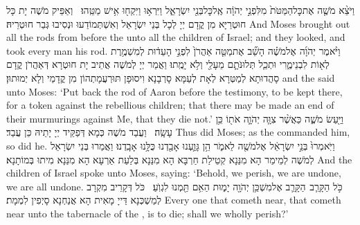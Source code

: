 {וַיֹּצֵ֨א מֹשֶׁ֤ה אֶת\maqqaf כׇּל\maqqaf הַמַּטֹּת֙ מִלִּפְנֵ֣י יְהֹוָ֔ה אֶֽל\maqqaf כׇּל\maqqaf בְּנֵ֖י יִשְׂרָאֵ֑ל וַיִּרְא֥וּ וַיִּקְח֖וּ אִ֥ישׁ מַטֵּֽהוּ׃ \petucha }
{וְאַפֵּיק מֹשֶׁה יָת כָּל חוּטְרַיָּא מִן קֳדָם יְיָ לְכָל בְּנֵי יִשְׂרָאֵל וְאִשְׁתְּמוֹדַעוּ וּנְסִיבוּ גְּבַר חוּטְרֵיהּ׃}
{And Moses brought out all the rods from before the \lord\space unto all the children of Israel; and they looked, and took every man his rod.}{}
{וַיֹּ֨אמֶר יְהֹוָ֜ה אֶל\maqqaf מֹשֶׁ֗ה הָשֵׁ֞ב אֶת\maqqaf מַטֵּ֤ה אַהֲרֹן֙ לִפְנֵ֣י הָעֵד֔וּת לְמִשְׁמֶ֥רֶת לְא֖וֹת לִבְנֵי\maqqaf מֶ֑רִי וּתְכַ֧ל תְּלוּנֹּתָ֛ם מֵעָלַ֖י וְלֹ֥א יָמֻֽתוּ׃}
{וַאֲמַר יְיָ לְמֹשֶׁה אֲתֵיב יָת חוּטְרָא דְּאַהֲרֹן קֳדָם סָהֲדוּתָא לְמַטְּרָא לְאָת לְעַמָּא סָרְבָנָא וִיסוּפָן תּוּרְעֲמָתְהוֹן מִן קֳדָמַי וְלָא יְמוּתוּן׃}
{and the \lord\space said unto Moses: ‘Put back the rod of Aaron before the testimony, to be kept there, for a token against the rebellious children; that there may be made an end of their murmurings against Me, that they die not.’}{}
{וַיַּ֖עַשׂ מֹשֶׁ֑ה כַּאֲשֶׁ֨ר צִוָּ֧ה יְהֹוָ֛ה אֹת֖וֹ כֵּ֥ן עָשָֽׂה׃ \petucha }
{וַעֲבַד מֹשֶׁה כְּמָא דְּפַקֵּיד יְיָ יָתֵיהּ כֵּן עֲבַד׃}
{Thus did Moses; as the \lord\space commanded him, so did he.}{}
{וַיֹּֽאמְרוּ֙ בְּנֵ֣י יִשְׂרָאֵ֔ל אֶל\maqqaf מֹשֶׁ֖ה לֵאמֹ֑ר הֵ֥ן גָּוַ֛עְנוּ אָבַ֖דְנוּ כֻּלָּ֥נוּ אָבָֽדְנוּ׃}
{וַאֲמַרוּ בְּנֵי יִשְׂרָאֵל לְמֹשֶׁה לְמֵימַר הָא מִנַּנָא קְטֵילַת חַרְבָּא הָא מִנַּנָא בְּלַעַת אַרְעָא הָא מִנַּנָא מִיתוּ בְּמוֹתָנָא׃}
{And the children of Israel spoke unto Moses, saying: ‘Behold, we perish, we are undone, we are all undone.}{}
{כֹּ֣ל הַקָּרֵ֧ב \pasek  הַקָּרֵ֛ב אֶל\maqqaf מִשְׁכַּ֥ן יְהֹוָ֖ה יָמ֑וּת הַאִ֥ם תַּ֖מְנוּ לִגְוֺֽעַ׃ \setuma }
{כֹּל דְּקָרֵיב מִקְרָב לְמַשְׁכְּנָא דַּייָ מָאִית הָא אֲנַחְנָא סָיְפִין לִמְמָת׃}
{Every one that cometh near, that cometh near unto the tabernacle of the \lord, is to die; shall we wholly perish?’}{}

